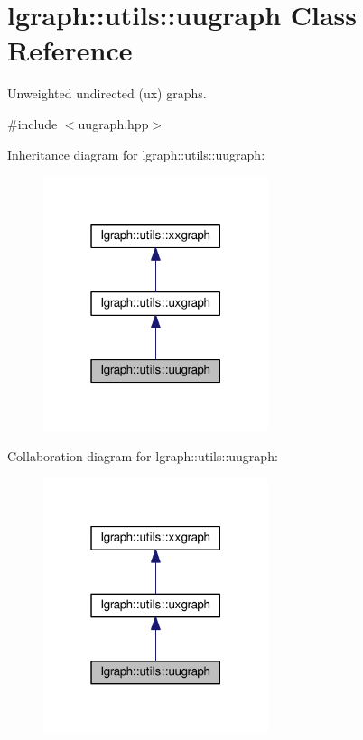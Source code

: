 \hypertarget{classlgraph_1_1utils_1_1uugraph}{}\section{lgraph\+:\+:utils\+:\+:uugraph Class Reference}
\label{classlgraph_1_1utils_1_1uugraph}


Unweighted undirected (ux) graphs.  




{\ttfamily \#include $<$uugraph.\+hpp$>$}



Inheritance diagram for lgraph\+:\+:utils\+:\+:uugraph\+:\nopagebreak
\begin{figure}[H]
\begin{center}
\leavevmode
\includegraphics[width=187pt]{classlgraph_1_1utils_1_1uugraph__inherit__graph}
\end{center}
\end{figure}


Collaboration diagram for lgraph\+:\+:utils\+:\+:uugraph\+:\nopagebreak
\begin{figure}[H]
\begin{center}
\leavevmode
\includegraphics[width=187pt]{classlgraph_1_1utils_1_1uugraph__coll__graph}
\end{center}
\end{figure}

